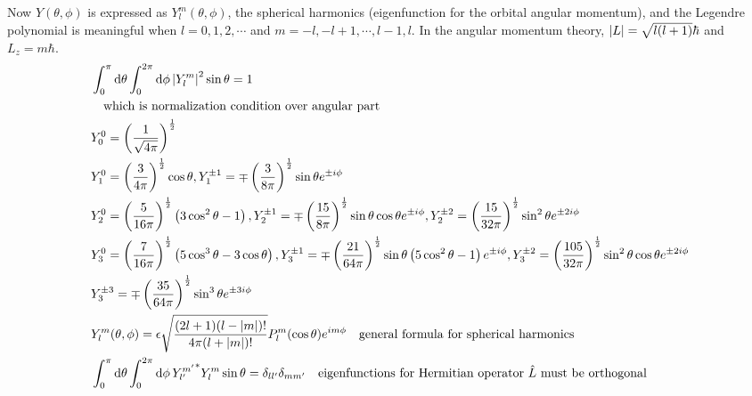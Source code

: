 \documentclass[a4paper,10pt]{article}
\begin{document}
Now $Y(\theta,\phi)$ is expressed as $Y_l^m(\theta,\phi)$, the spherical harmonics (eigenfunction for the orbital angular momentum), and the Legendre polynomial is meaningful when $l=0,1,2,\cdots$ and $m=-l,-l+1,\cdots,l-1,l$.
In the angular momentum theory, $\abs{L}=\sqrt{l(l+1)}\hbar$ and $L_z=m\hbar$.
\begin{align*}
     & \int_0^{\pi}\dd{\theta}\int_0^{2\pi}\dd{\phi}\abs{Y_l^m}^2\sin\theta=1                                                                                                                                                                                                                      \\
     & \qq{which is normalization condition over angular part}                                                                                                                                                                                                                                     \\
     & Y_0^0=\left(\frac{1}{\sqrt{4\pi}}\right)^\frac{1}{2}                                                                                                                                                                                                                                        \\
     & Y_1^0=\left(\frac{3}{4\pi}\right)^\frac{1}{2}\cos\theta, Y_1^{\pm1}=\mp\left(\frac{3}{8\pi}\right)^\frac{1}{2}\sin\theta e^{\pm i\phi}                                                                                                                                                      \\
     & Y_2^0=\left(\frac{5}{16\pi}\right)^\frac{1}{2}\left(3\cos^2\theta-1\right), Y_2^{\pm1}=\mp\left(\frac{15}{8\pi}\right)^\frac{1}{2}\sin\theta\cos\theta e^{\pm i\phi}, Y_2^{\pm2}=\left(\frac{15}{32\pi}\right)^\frac{1}{2}\sin^2\theta e^{\pm2i\phi}                                        \\
     & Y_3^0=\left(\frac{7}{16\pi}\right)^\frac{1}{2}\left(5\cos^3\theta-3\cos\theta\right), Y_3^{\pm1}=\mp\left(\frac{21}{64\pi}\right)^\frac{1}{2}\sin\theta\left(5\cos^2\theta-1\right)e^{\pm i\phi}, Y_3^{\pm2}=\left(\frac{105}{32\pi}\right)^\frac{1}{2}\sin^2\theta\cos\theta e^{\pm2i\phi} \\
     & Y_3^{\pm3}=\mp\left(\frac{35}{64\pi}\right)^\frac{1}{2}\sin^3\theta e^{\pm3i\phi}                                                                                                                                                                                                           \\
     & Y_l^m(\theta,\phi)=\epsilon\sqrt{\frac{(2l+1)(l-\abs{m})!}{4\pi(l+\abs{m})!}}P_l^{m}(\cos\theta)e^{im\phi}\qq{general formula for spherical harmonics}                                                                                                                                      \\
     & \int_0^{\pi}\dd{\theta}\int_0^{2\pi}\dd{\phi}{Y_{l^\prime}^{m^\prime}}^\ast Y_l^m\sin\theta=\delta_{ll^\prime}\delta_{mm^\prime}\qq{eigenfunctions for Hermitian operator $\hat{L}$ must be orthogonal}
\end{align*}
\end{document}
